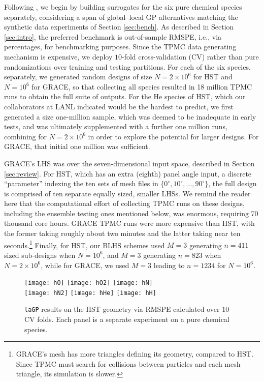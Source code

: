 \documentclass[12pt]{article}
\begin{document}
Following \citet{metha:etal:2014}, we begin by building surrogates for the six
pure chemical species separately, considering a span of global--local GP
alternatives matching the synthetic data experiments of Section
\ref{sec:bench}. As described in Section \ref{sec:intro}, the preferred
benchmark is out-of-sample RMSPE, i.e., via percentages, for benchmarking
purposes. Since the TPMC data generating mechanism is expensive, we deploy
$10$-fold cross-validation (CV) rather than pure randomizations over training
and testing partitions. For each of the six species, separately, we generated
random designs of size $N=2 \times 10^6$ for HST 
and $N=10^6$ for GRACE, so
that collecting all species resulted in 18 million TPMC runs to obtain the
full suite of outputs. For the He species of HST, which our collaborators at
LANL indicated would be the hardest to predict, we first generated a
size one-million sample, which was deemed to be inadequate in early tests,
and was ultimately supplemented with a further one million runs, combining for
$N=2 \times 10^6$ in order to explore the potential for larger designs.  For
GRACE, that initial one million was sufficient.

GRACE's LHS was over the seven-dimensional input space, described in Section
\ref{sec:review}. For HST, which has an extra (eighth) panel angle input, a
discrete ``parameter'' indexing the ten sets of mesh files in $\{0^\circ,
10^\circ, \dots, 90^\circ\}$, the full design is comprised of ten separate
equally sized, smaller LHSs.  We remind the reader here that the computational
effort of collecting TPMC runs on these designs, including the ensemble
testing ones mentioned below, was enormous, requiring 70 thousand core hours.
GRACE TPMC runs were more expensive than HST, with the former taking roughly about
two minutes and the latter taking near ten seconds.\footnote{GRACE's mesh
has more triangles defining its geometry, compared to HST.  Since TPMC must
search for collisions between particles and each mesh triangle, its simulation
is slower.} Finally, for HST, our BLHS schemes used $M=3$ generating $n=411$
sized sub-designs when $N=10^6$, and $M=3$ 
generating $n=823$ when $N=2 \times 10^6$, while for 
GRACE, we used $M=3$ leading to $n=1234$ for $N=10^6$.

\begin{figure}[ht!]
\texttt{[image: hO]}
\texttt{[image: hO2]}
\texttt{[image: hN]}\\

\texttt{[image: hN2]} 
\texttt{[image: hHe]}
\texttt{[image: hH]}
\caption{{\tt laGP} results on the HST geometry via RMSPE calculated over 10
CV folds.  Each panel is a separate experiment on a pure
chemical species.}
\label{f:hst_all_cv_compare}
\end{figure}	
\end{document}
